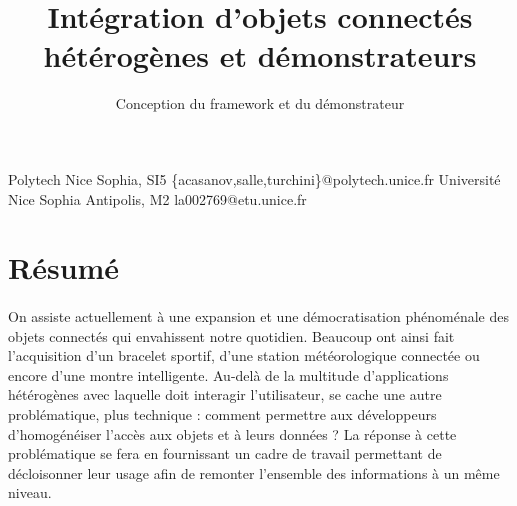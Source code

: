 \documentclass[nocopyrightspace]{sigplanconf}
\begin{document}
\setlength{\pdfpageheight}{\paperheight}
\setlength{\pdfpagewidth}{\paperwidth}





\title{Intégration d’objets connectés hétérogènes et démonstrateurs}
\subtitle{Conception du framework et du démonstrateur}

           {Polytech Nice Sophia, SI5}
           {\{acasanov,salle,turchini\}@polytech.unice.fr}
           {Université Nice Sophia Antipolis, M2}
           {la002769@etu.unice.fr}

\maketitle


\section*{Résumé}
	\paragraph{}
	On assiste actuellement à une expansion et une démocratisation phénoménale des objets connectés qui envahissent notre quotidien. Beaucoup ont ainsi fait l’acquisition d’un bracelet sportif, d’une station météorologique connectée ou encore d’une montre intelligente. Au-delà de la multitude d’applications hétérogènes avec laquelle doit interagir l’utilisateur, se cache une autre problématique, plus technique : comment permettre aux développeurs d’homogé\-néiser l’accès aux objets et à leurs données ? La réponse à cette problématique se fera en fournissant un cadre de travail permettant de décloisonner leur usage afin de remonter l’ensemble des informations à un même niveau.
\end{document}
